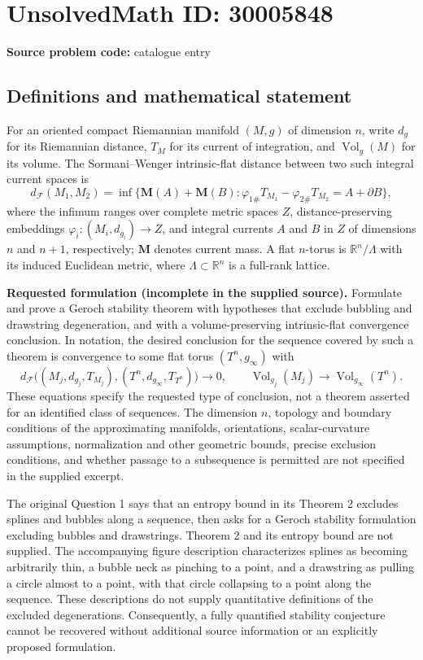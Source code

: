 \documentclass[11pt]{article}
\newcommand{\R}{\mathbb{R}}
\begin{document}
\section*{UnsolvedMath ID: 30005848}
\textbf{Source problem code:} catalogue entry
\subsection{Definitions and mathematical statement}
For an oriented compact Riemannian manifold $(M,g)$ of dimension $n$, write $d_g$ for its Riemannian distance, $T_M$ for its current of integration, and $\operatorname{Vol}_g(M)$ for its volume. The Sormani--Wenger intrinsic-flat distance between two such integral current spaces is
\[
 d_{\mathcal F}(M_1,M_2)
 =\inf\bigl\{\mathbf M(A)+\mathbf M(B):
 \varphi_{1\#}T_{M_1}-\varphi_{2\#}T_{M_2}
 =A+\partial B\bigr\},
\]
where the infimum ranges over complete metric spaces $Z$, distance-preserving embeddings $\varphi_i:(M_i,d_{g_i})\to Z$, and integral currents $A$ and $B$ in $Z$ of dimensions $n$ and $n+1$, respectively; $\mathbf M$ denotes current mass. A flat $n$-torus is $\R^n/\Lambda$ with its induced Euclidean metric, where $\Lambda\subset\R^n$ is a full-rank lattice.

\textbf{Requested formulation (incomplete in the supplied source).} Formulate and prove a Geroch stability theorem with hypotheses that exclude bubbling and drawstring degeneration, and with a volume-preserving intrinsic-flat convergence conclusion. In notation, the desired conclusion for the sequence covered by such a theorem is convergence to some flat torus $(T^n,g_\infty)$ with
\[
 d_{\mathcal F}\bigl((M_j,d_{g_j},T_{M_j}),
 (T^n,d_{g_\infty},T_{T^n})\bigr)\longrightarrow0,
 \qquad
 \operatorname{Vol}_{g_j}(M_j)
 \longrightarrow\operatorname{Vol}_{g_\infty}(T^n).
\]
These equations specify the requested type of conclusion, not a theorem asserted for an identified class of sequences. The dimension $n$, topology and boundary conditions of the approximating manifolds, orientations, scalar-curvature assumptions, normalization and other geometric bounds, precise exclusion conditions, and whether passage to a subsequence is permitted are not specified in the supplied excerpt.

The original Question 1 says that an entropy bound in its Theorem 2 excludes splines and bubbles along a sequence, then asks for a Geroch stability formulation excluding bubbles and drawstrings. Theorem 2 and its entropy bound are not supplied. The accompanying figure description characterizes splines as becoming arbitrarily thin, a bubble neck as pinching to a point, and a drawstring as pulling a circle almost to a point, with that circle collapsing to a point along the sequence. These descriptions do not supply quantitative definitions of the excluded degenerations. Consequently, a fully quantified stability conjecture cannot be recovered without additional source information or an explicitly proposed formulation.
\end{document}
